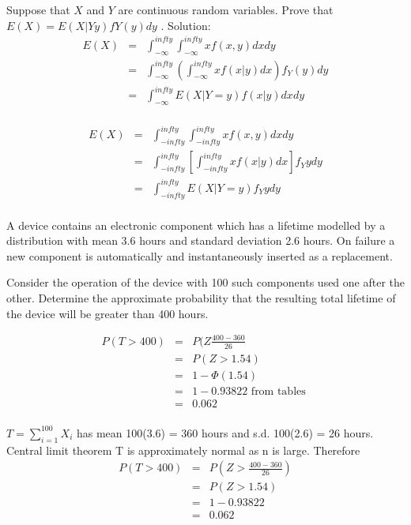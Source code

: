 \documentclass[a4paper,12pt]{article}
\begin{document}

Suppose that $X$ and $Y$ are continuous random variables.
Prove that $E(X )  =E(X|Y y)fY( y)dy$ .
Solution: 
\begin{eqnarray*}
E(X)&=&  \int^{infty}_{-\infty} \int^{infty}_{-\infty} x f(x,y) dx dy\\
&=&  \int^{infty}_{-\infty} \left( \int^{infty}_{-\infty} x f(x|y) dx \right) f_Y(y) dy\\
&=&  \int^{infty}_{-\infty} E(X|Y=y) f(x|y) dx dy\\
\end{eqnarray*}


\begin{eqnarray*} 
E(X) &=& \int^{infty}_{-infty} \int^{infty}_{-infty}x f(x,y) dx dy \\
&=& \int^{infty}_{-infty} \left[ \int^{infty}_{-infty}x f(x|y) dx \right] f_Y{y} dy \\
&=& \int^{infty}_{-infty} E(X|Y=y) f_Y{y} dy \\
\end{eqnarray*}

\newpage 

\noindent A device contains an electronic component which has a lifetime modelled by a distribution with mean 3.6 hours and standard deviation 2.6 hours. On failure a new component is automatically and instantaneously inserted as a replacement.


Consider the operation of the device with 100 such components used one after
the other. Determine the approximate probability that the resulting total
lifetime of the device will be greater than 400 hours. 


\begin{eqnarray*}
P(T > 400) &=& P(Z \frac{400-360}{26} \\
&=& P(Z > 1.54)\\
&=& 1 - \Phi(1.54) \\
&=& 1 - 0.93822  \mbox{ from tables }\\
&=& 0.062 \\
\end{eqnarray*}




$T = \sum^{100}_{i=1} X_i$ has mean 100(3.6) = 360 hours
and s.d. 100(2.6) = 26 hours.
Central limit theorem 
 T is approximately normal as n is large.
Therefore
\begin{eqnarray*}
P(T > 400) &=& P \left(Z > \frac{400-360}{26} \right) \\
&=& P \left(Z >1.54 \right) \\
&=& 1 - 0.93822 \\
&=& 0.062
\end{eqnarray*}
\end{document}
